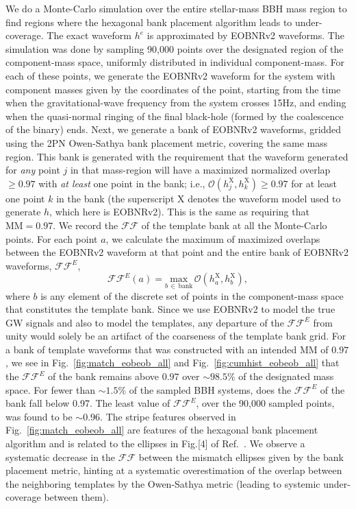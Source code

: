 \documentclass[aps,
prd,
amsmath,
amssymb,
twocolumn,
floatfix,
groupedaddress]{revtex4-1}
\newcommand{\Olap}{\mathcal{O}}
\newcommand{\FF}{\mathcal{FF}}
\newcommand{\MM}{\mathrm{MM}}
\newcommand{\X}{\mathrm{X}}
\begin{document}
We do a Monte-Carlo simulation over the entire stellar-mass BBH mass region to find regions where the hexagonal bank placement algorithm leads to under-coverage. The exact waveform $h^e$ is approximated by EOBNRv2 waveforms. The simulation was done by sampling 90,000 points over the designated region of the component-mass space, uniformly distributed in individual component-mass. For each of these points, we generate the EOBNRv2 waveform for the system with component masses given by the coordinates of the point, starting from the time when the gravitational-wave frequency from the system crosses 15Hz, and ending when the quasi-normal ringing of the final black-hole (formed by the coalescence of the binary) ends. Next, we generate a bank of EOBNRv2 waveforms, gridded using the 2PN Owen-Sathya bank placement metric, covering the same mass region. This bank is generated with the requirement that the waveform generated for \textit{any} point $j$ in that mass-region will have a maximized normalized overlap $\geq 
0.97$ with \textit{at least} one point in the bank; i.e., $\Olap(h^{\X}_j,h^{\X}_k)\geq 0.97$ for at least one point $k$ in the bank (the superscript $\X$ denotes the waveform model used to generate $h$, which here is EOBNRv2). This is the same as requiring that $\MM=0.97$. We record the $\mathcal{FF}$ of the template bank at all the Monte-Carlo points. For each point $a$, we calculate the maximum of maximized overlaps between the EOBNRv2 waveform at that point and the entire bank of EOBNRv2 waveforms, $\mathcal{FF}^E$,
\begin{equation}
\mathcal{FF}^E(a) = \underset{b\,\in\,\mathrm{bank}}{\mathrm{max}}\,\Olap(h^{\X}_a,h^{\X}_b),
\end{equation}
where $b$ is any element of the discrete set of points in the component-mass space that constitutes the template bank. Since we use EOBNRv2 to model the true GW signals and also to model the templates, any departure of the $\FF^E$ from unity would solely be an artifact of the coarseness of the template bank grid. For a bank of template waveforms that was constructed with an intended $\MM$ of $0.97$, we see in Fig.~\ref{fig:match_eobeob_all} and Fig.~\ref{fig:cumhist_eobeob_all} that the $\mathcal{FF}^E$ of the bank remains above $0.97$ over $\sim 98.5\%$ of the designated mass space. For fewer than $\sim 1.5\%$ of the sampled BBH systems, does the $\mathcal{FF}^E$ of the bank fall below 0.97. The least value of $\mathcal{FF}^E$, over the 90,000 sampled points, was found to be $\sim 0.96$. The stripe features observed in Fig.~\ref{fig:match_eobeob_all} are features of the hexagonal bank placement algorithm and is related to the ellipses in Fig.[4] of Ref.~\citep{BabaketalBankPlacement}. We observe a 
systematic decrease in the $\FF$ between the mismatch ellipses given by the bank placement metric, hinting at a systematic overestimation of the overlap between the neighboring templates by the Owen-Sathya metric (leading to systemic under-coverage between them).
\end{document}
